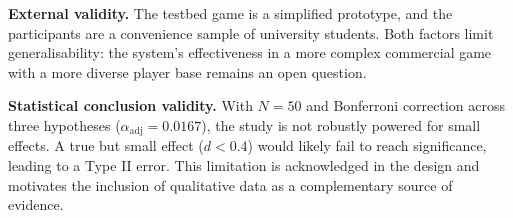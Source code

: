 \textbf{External validity.} The testbed game is a simplified prototype, and the participants are a convenience sample of university students. Both factors limit generalisability: the system's effectiveness in a more complex commercial game with a more diverse player base remains an open question.

\textbf{Statistical conclusion validity.} With $N = 50$ and Bonferroni correction across three hypotheses ($\alpha_{\text{adj}} = 0.0167$), the study is not robustly powered for small effects. A true but small effect ($d < 0.4$) would likely fail to reach significance, leading to a Type II error. This limitation is acknowledged in the design and motivates the inclusion of qualitative data as a complementary source of evidence.

